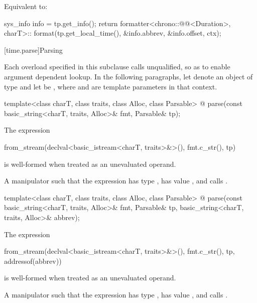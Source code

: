 \begin{itemdescr}
\pnum
\effects
Equivalent to:
\begin{codeblock}
sys_info info = tp.get_info();
return formatter<chrono::@@<Duration>, charT>::
         format({tp.get_local_time(), &info.abbrev, &info.offset}, ctx);
\end{codeblock}
\end{itemdescr}

%

[time.parse]{Parsing}

%

\pnum
Each  overload specified in this subclause
calls  unqualified,
so as to enable argument dependent lookup.
In the following paragraphs,
let  denote an object of type  and
let  be ,
where  and  are template parameters in that context.

\begin{itemdecl}
template<class charT, class traits, class Alloc, class Parsable>
  @\unspec@
    parse(const basic_string<charT, traits, Alloc>& fmt, Parsable& tp);
\end{itemdecl}

\begin{itemdescr}
\pnum
\constraints
The expression
\begin{codeblock}
from_stream(declval<basic_istream<charT, traits>&>(), fmt.c_str(), tp)
\end{codeblock}
is well-formed when treated as an unevaluated operand.

\pnum
\returns
A manipulator such that
the expression 
has type ,
has value , and
calls .
\end{itemdescr}

\begin{itemdecl}
template<class charT, class traits, class Alloc, class Parsable>
  @\unspec@
    parse(const basic_string<charT, traits, Alloc>& fmt, Parsable& tp,
          basic_string<charT, traits, Alloc>& abbrev);
\end{itemdecl}

\begin{itemdescr}
\pnum
\constraints
The expression
\begin{codeblock}
from_stream(declval<basic_istream<charT, traits>&>(), fmt.c_str(), tp, addressof(abbrev))
\end{codeblock}
is well-formed when treated as an unevaluated operand.

\pnum
\returns
A manipulator such that
the expression 
has type ,
has value , and
calls .
\end{itemdescr}

